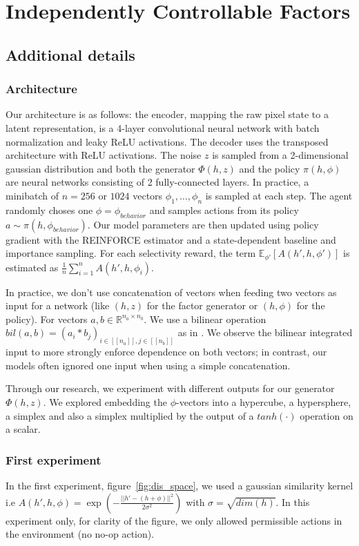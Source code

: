 \chapter{Independently Controllable Factors}

\section{Additional details}
\subsection{Architecture}
Our architecture is as follows: the encoder, mapping the raw pixel state to a latent representation, is a 4-layer convolutional neural network with batch normalization \citep{ioffe2015batch} and leaky ReLU activations. The decoder uses the transposed architecture with ReLU activations. The noise $z$ is sampled from a 2-dimensional gaussian distribution and both the generator $\Phi(h,z)$ and the policy $\pi(h,\phi)$ are neural networks consisting of 2 fully-connected layers. In practice, a minibatch of $n = 256$ or $1024$ vectors $\phi_1, \dots, \phi_{n}$ is sampled at each step. The agent randomly choses one $\phi = \phi_{behavior}$ and samples actions from its policy $a \sim \pi(h, \phi_{behavior})$. Our model parameters are then updated using policy gradient with the REINFORCE estimator and a state-dependent baseline and importance sampling. For each selectivity reward, the term $\mathbb{E}_{\phi'}[  A(h', h,\phi')]$ is estimated as $\tfrac{1}{n} \sum_{i = 1}^n A(h', h,\phi_i)$.

In practice, we don't use concatenation of vectors when feeding two vectors as input for a network (like $(h, z)$ for the factor generator or $(h, \phi)$ for the policy).
For vectors $a,b \in \mathbb{R}^{n_a \times n_b}$. We use a bilinear operation $bil(a, b) = (a_i * b_j)_{i \in [[n_a]], j \in [[n_b]]}$ as in \cite{florensa2017stochastic}.  We observe the bilinear integrated input to more strongly enforce dependence on both vectors; in contrast, our models often ignored one input when using a simple concatenation.

Through our research, we experiment with different outputs for our generator $\Phi(h,z)$.  We explored embedding the $\phi$-vectors into a hypercube, a hypersphere, a simplex and also a simplex multiplied by the output of a $tanh(\cdot)$ operation on a scalar.

\subsection{First experiment}
In the first experiment, figure~\ref{fig:dis_space}, we used a gaussian similarity kernel i.e $A(h', h, \phi) = \exp(- \frac{||h' - (h+\phi)||^2}{2 \sigma^2})$ with $\sigma = \sqrt{dim(h)}$.
In this experiment only, for clarity of the figure, we only allowed permissible actions in the environment (no no-op action).


